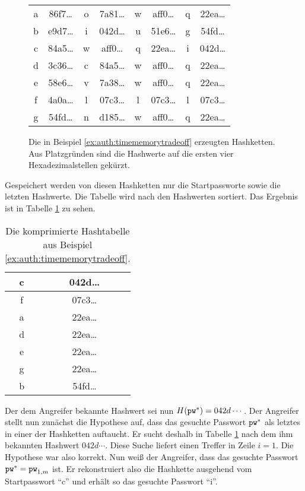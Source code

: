 \begin{beispiel}
\begin{figure}[h]
\begin{center}
	\begin{tabular}{c@{$\;\hasharrow\;$}c@{$\;\VRTF\;$}c@{$\;\hasharrow\;$}c@{$\;\VRTF\;$}c@{$\;\hasharrow\;$}c@{$\;\VRTF\;$}c@{$\;\hasharrow\;$}c}
a & 86f7\ldots & o & 7a81\ldots & w & aff0\ldots & q & 22ea\ldots\\ b &
e9d7\ldots & i & 042d\ldots & u & 51e6\ldots & g & 54fd\ldots\\ c &
84a5\ldots & w & aff0\ldots & q & 22ea\ldots & i & 042d\ldots\\ d &
3c36\ldots & c & 84a5\ldots & w & aff0\ldots & q & 22ea\ldots\\ e &
58e6\ldots & v & 7a38\ldots & w & aff0\ldots & q & 22ea\ldots\\ f &
4a0a\ldots & l & 07c3\ldots & l & 07c3\ldots & l & 07c3\ldots\\ g &
54fd\ldots & n & d185\ldots & w & aff0\ldots & q & 22ea\ldots\\
	\end{tabular}
	\caption{Die in Beispiel \ref{ex:auth:timememorytradeoff}
erzeugten Hashketten. Aus Platzgründen sind die Hashwerte auf die ersten
vier Hexadezimalstellen gekürzt.}
	\label{fig:auth:timememorytradeoff:hashchains}
\end{center}
\end{figure}

Gespeichert werden von diesen Hashketten nur die Startpassworte sowie
die letzten Hashwerte. Die Tabelle wird nach den Hashwerten
sortiert. Das Ergebnis ist in Tabelle
\ref{table:auth:timememorytradeoff:hashtable} zu sehen.

\begin{table}[h]
	\begin{center}
		\begin{tabular}{|c|c|} \hline c & 042d\ldots\\\hline f &
07c3\ldots\\\hline a & 22ea\ldots\\\hline d & 22ea\ldots\\\hline e &
22ea\ldots\\\hline g & 22ea\ldots\\\hline b & 54fd\ldots\\\hline
		\end{tabular}
	\end{center}
	\caption{Die komprimierte Hashtabelle aus Beispiel
\ref{ex:auth:timememorytradeoff}.}
	\label{table:auth:timememorytradeoff:hashtable}
\end{table}

Der dem Angreifer bekannte Hashwert sei nun $H(\texttt{pw}^*) = 042d\cdots$.
Der Angreifer stellt nun zunächst die Hypothese auf, dass das gesuchte
Passwort $\texttt{pw}^*$ als letztes in einer der Hashketten auftaucht. Er sucht
deshalb in Tabelle \ref{table:auth:timememorytradeoff:hashtable} nach
dem ihm bekannten Hashwert $042d\cdots$. Diese Suche liefert einen
Treffer in Zeile $i = 1$. Die Hypothese war also korrekt. Nun weiß der
Angreifer, dass das gesuchte Passwort $\texttt{pw}^* = \texttt{pw}_{1,m}$ ist. Er
rekonstruiert also die Hashkette ausgehend vom Startpasswort "`c"' und
erhält so das gesuchte Passwort "`i"'.
\end{beispiel}

